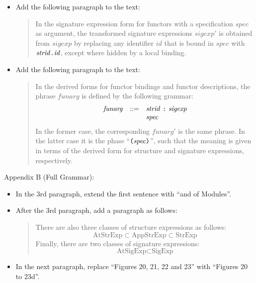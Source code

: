 \documentclass[twoside,titlepage]{article}
\begin{document}
\begin{appendix}
\begin{itemize}
\item Add the following paragraph to the text:
  \begin{quote}
  In the signature expression form for functors with a specification $\mathit{spec}$ as argument, the transformed signature expressions $\mathit{sigexp}'$ is obtained from $\mathit{sigexp}$ by replacing any identifier $\mathit{id}$ that is bound in $\mathit{spec}$ with $\mathit{strid}\mbox{\tt.}\mathit{id}$, except where hidden by a local binding.
  \end{quote}

\item Add the following paragraph to the text:
  \begin{quote}
  In the derived forms for functor bindings and functor descriptions, the phrase $\mathit{funarg}$ is defined by the following grammar:
  $$
  \begin{array}{lll}
  \mathit{funarg} & ::= & \mathit{strid}~\mbox{\tt:}~\mathit{sigexp} \\
  && \mathit{spec}
  \end{array}
  $$
  In the former case, the corresponding $\mathit{funarg}'$ is the same phrase. In the latter case it is the phase ``$\mbox{\tt(}\mathit{spec}\mbox{\tt)}$'', such that the meaning is given in terms of the derived form for structure and signature expressions, respectively.
  \end{quote}
\end{itemize}

Appendix B (Full Grammar):
\begin{itemize}
\item In the 3rd paragraph, extend the first sentence with ``and of Modules''.

\item After the 3rd paragraph, add a paragraph as follows:
  \begin{quote}
  There are also three classes of structure expressions as follows:
  $$
  \mbox{AtStrExp} \subset \mbox{AppStrExp} \subset \mbox{StrExp}
  $$
  Finally, there are two classes of signature expressions:
  $$
  \mbox{AtSigExp} \subset \mbox{SigExp}
  $$
  \end{quote}

\item In the next paragraph, replace ``Figures 20, 21, 22 and 23'' with ``Figures 20 to 23d''.


\end{itemize}
\end{appendix}
\end{document}
